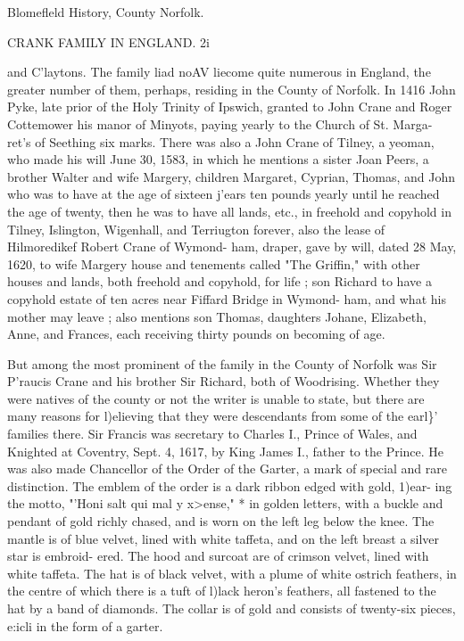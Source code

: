\documentclass[oneside]{book}
\begin{document}
Blomefleld History, County Norfolk. 



CRANK FAMILY IN ENGLAND. 2i 

and C'laytons. The family liad noAV liecome quite numerous in 
England, the greater number of them, perhaps, residing in the 
County of Norfolk. In 1416 John Pyke, late prior of the Holy 
Trinity of Ipswich, granted to John Crane and Roger Cottemower 
his manor of Minyots, paying yearly to the Church of St. Marga- 
ret's of Seething six marks. There was also a John Crane of 
Tilney, a yeoman, who made his will June 30, 1583, in which he 
mentions a sister Joan Peers, a brother Walter and wife Margery, 
children Margaret, Cyprian, Thomas, and John who was to have 
at the age of sixteen j'ears ten pounds yearly until he reached 
the age of twenty, then he was to have all lands, etc., in freehold 
and copyhold in Tilney, Islington, Wigenhall, and Terriugton 
forever, also the lease of Hilmoredikef Robert Crane of Wymond- 
ham, draper, gave by will, dated 28 May, 1620, to wife Margery 
house and tenements called "The Griffin," with other houses and 
lands, both freehold and copyhold, for life ; son Richard to have 
a copyhold estate of ten acres near Fiffard Bridge in Wymond- 
ham, and what his mother may leave ; also mentions son Thomas, 
daughters Johane, Elizabeth, Anne, and Frances, each receiving 
thirty pounds on becoming of age. 

But among the most prominent of the family in the County of 
Norfolk was Sir P'raucis Crane and his brother Sir Richard, both 
of Woodrising. Whether they were natives of the county or not 
the writer is unable to state, but there are many reasons for 
l)elieving that they were descendants from some of the earl\}' 
families there. Sir Francis was secretary to Charles I., Prince 
of Wales, and Knighted at Coventry, Sept. 4, 1617, by King 
James I., father to the Prince. He was also made Chancellor of 
the Order of the Garter, a mark of special and rare distinction. 
The emblem of the order is a dark ribbon edged with gold, 1)ear- 
ing the motto, "'Honi salt qui mal y x>ense," * in golden letters, 
with a buckle and pendant of gold richly chased, and is worn on 
the left leg below the knee. The mantle is of blue velvet, lined 
with white taffeta, and on the left breast a silver star is embroid- 
ered. The hood and surcoat are of crimson velvet, lined with 
white taffeta. The hat is of black velvet, with a plume of white 
ostrich feathers, in the centre of which there is a tuft of l)lack 
heron's feathers, all fastened to the hat by a band of diamonds. 
The collar is of gold and consists of twenty-six pieces, e:icli in 
the form of a garter. 
\end{document}
